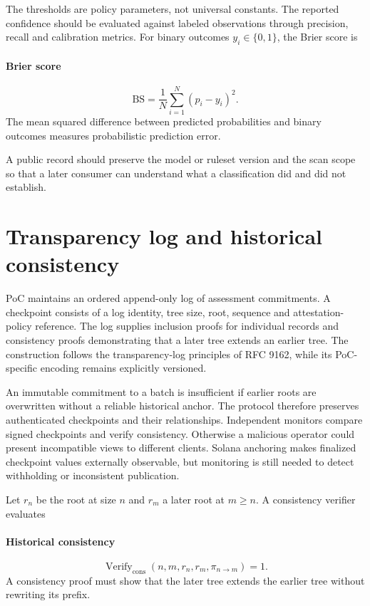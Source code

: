 \documentclass[10pt,a4paper]{article}
\begin{document}
The thresholds are policy parameters, not universal constants. The reported confidence should be evaluated against labeled observations through precision, recall and calibration metrics. For binary outcomes \(y_i\in\{0,1\}\), the Brier score is


\paragraph{Brier score}
\[\mathrm{BS}=\frac{1}{N}\sum_{i=1}^{N}(p_i-y_i)^2.\]
The mean squared difference between predicted probabilities and binary outcomes measures probabilistic prediction error.


A public record should preserve the model or ruleset version and the scan scope so that a later consumer can understand what a classification did and did not establish.


\section*{Transparency log and historical consistency}
PoC maintains an ordered append-only log of assessment commitments. A checkpoint consists of a log identity, tree size, root, sequence and attestation-policy reference. The log supplies inclusion proofs for individual records and consistency proofs demonstrating that a later tree extends an earlier tree. The construction follows the transparency-log principles of RFC 9162, while its PoC-specific encoding remains explicitly versioned.


An immutable commitment to a batch is insufficient if earlier roots are overwritten without a reliable historical anchor. The protocol therefore preserves authenticated checkpoints and their relationships. Independent monitors compare signed checkpoints and verify consistency. Otherwise a malicious operator could present incompatible views to different clients. Solana anchoring makes finalized checkpoint values externally observable, but monitoring is still needed to detect withholding or inconsistent publication.


Let \(r_n\) be the root at size \(n\) and \(r_m\) a later root at \(m\ge n\). A consistency verifier evaluates


\paragraph{Historical consistency}
\[\operatorname{Verify}_{\mathrm{cons}}(n,m,r_n,r_m,\pi_{n\rightarrow m})=1.\]
A consistency proof must show that the later tree extends the earlier tree without rewriting its prefix.
\end{document}
